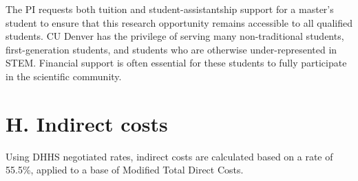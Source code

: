 \documentclass[11pt,oneside]{memoir}
\begin{document}
The PI requests both tuition and student-assistantship support for a master's student to ensure that this research opportunity remains accessible to all qualified students.  CU Denver has the privilege of serving many non-traditional students, first-generation students, and students who are otherwise under-represented in STEM.  Financial support is often essential for these students to fully participate in the scientific community.

\section*{H. Indirect costs} 

Using DHHS negotiated rates, indirect costs are calculated based on a rate of 55.5\%, applied to a base of Modified Total Direct Costs. 
\end{document}
